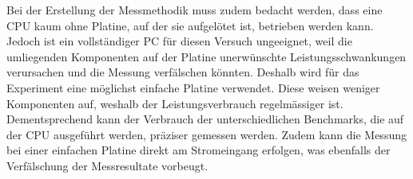 \par

Bei der Erstellung der Messmethodik muss zudem bedacht werden, dass eine CPU kaum ohne Platine, auf der sie aufgelötet ist, betrieben werden kann. Jedoch ist ein vollständiger PC für diesen Versuch ungeeignet, weil die umliegenden Komponenten auf der Platine unerwünschte Leistungsschwankungen verursachen und die Messung verfälschen könnten. Deshalb wird für das Experiment eine möglichst einfache Platine verwendet. Diese weisen weniger Komponenten auf, weshalb der Leistungsverbrauch regelmässiger ist. Dementsprechend kann der Verbrauch der unterschiedlichen Benchmarks, die auf der CPU ausgeführt werden, präziser gemessen werden. Zudem kann die Messung bei einer einfachen Platine direkt am Stromeingang erfolgen, was ebenfalls der Verfälschung der Messresultate vorbeugt.
